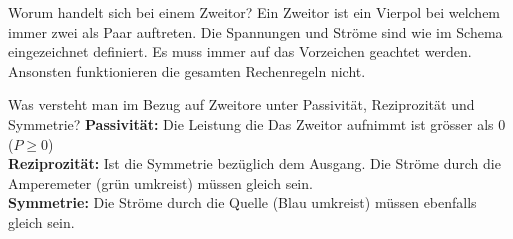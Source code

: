 
\begin{karte}{Worum handelt sich bei einem Zweitor?}
	Ein Zweitor ist ein Vierpol bei welchem immer zwei als Paar auftreten. Die Spannungen und Ströme sind wie im Schema eingezeichnet definiert. Es muss immer auf das Vorzeichen geachtet werden. Ansonsten funktionieren die gesamten Rechenregeln nicht.
	
	\centering{\scalebox{.9}{}}	
\end{karte}

\begin{karte}{Was versteht man im Bezug auf Zweitore unter Passivität, Reziprozität und Symmetrie?}
	\textbf{Passivität:} Die Leistung die Das Zweitor aufnimmt ist grösser als 0 ($P\ge 0$)\\
	\textbf{Reziprozität:} Ist die Symmetrie bezüglich dem Ausgang. Die Ströme durch die Amperemeter (grün umkreist) müssen gleich sein.\\
	\textbf{Symmetrie:} Die Ströme durch die Quelle (Blau umkreist) müssen ebenfalls gleich sein.
	
	\centering{\scalebox{.7}{}}
\end{karte}
